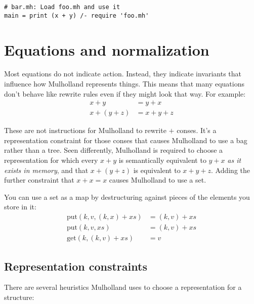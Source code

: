 \documentclass{report}
\begin{document}
\begin{verbatim}
# bar.mh: Load foo.mh and use it
main = print (x + y) /- require 'foo.mh'
\end{verbatim}

\chapter{Equations and normalization}
  Most equations do not indicate action. Instead, they indicate invariants that influence how Mulholland represents things. This means that many equations don't behave like rewrite rules even
  if they might look that way. For example:
\begin{align*}
x + y       & = y + x \\
x + (y + z) & = x + y + z
\end{align*}

  These are not instructions for Mulholland to rewrite $+$ conses. It's a representation constraint for those conses that causes Mulholland to use a bag rather than a tree. Seen differently,
  Mulholland is required to choose a representation for which every $x + y$ is semantically equivalent to $y + x$ {\em as it exists in memory}, and that $x + (y + z)$ is equivalent to $x + y +
  z$. Adding the further constraint that $x + x = x$ causes Mulholland to use a set.

  You can use a set as a map by destructuring against pieces of the elements you store in it:
\begin{align*}
\textrm{put}(k, v, (k, x) + xs) & = (k, v) + xs \\
\textrm{put}(k, v, xs)          & = (k, v) + xs \\
\textrm{get}(k, (k, v) + xs)    & = v
\end{align*}

\section{Representation constraints}
    There are several heuristics Mulholland uses to choose a representation for a structure:
\end{document}

